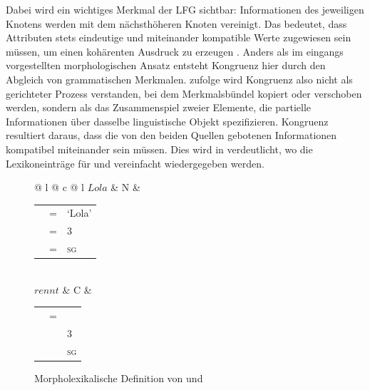Dabei wird ein wichtiges Merkmal der LFG sichtbar: Informationen des jeweiligen
Knotens werden mit dem nächsthöheren Knoten vereinigt. Das bedeutet, dass
Attributen stets eindeutige und miteinander kompatible Werte
zugewiesen sein müssen, um einen kohärenten Ausdruck zu erzeugen
\autocite[vgl.][43--54]{bresnanetal2016}. Anders als im eingangs vorgestellten
morphologischen Ansatz entsteht Kongruenz hier durch den Abgleich von
grammatischen Merkmalen.
\citet[7]{wechslerzlatic2003} zufolge wird Kongruenz also nicht als gerichteter
Prozess verstanden, bei dem Merkmalsbündel kopiert oder verschoben werden,
sondern als das Zusammenspiel zweier Elemente, die partielle Informationen über
dasselbe linguistische Objekt spezifizieren. Kongruenz resultiert daraus, dass
die von den beiden Quellen gebotenen Informationen kompatibel miteinander sein
müssen.
Dies wird in  verdeutlicht, wo die
Lexikoneinträge für
 und  vereinfacht wiedergegeben werden.

\begin{figure}
\begin{tabular}[t]{@{} l @{\hspace{2em}} c @{\hspace{2em}} l}
	$Lola$
	&	N
	&	\begin{tabular}[t]{l l l}
			\ups{pred}	& =	& `Lola' \\
			\ups{pers}	& =	& 3 \\
			\ups{num}	& =	& \textsc{sg} \\
		\end{tabular}
	\medskip \\

	$rennt$
	&	C
	&	\begin{tabular}[t]{l l l}
			\ups{pred}		& = 	& \astruct{rennen}{\ups{subj}} \\
			\ups{subj pers}	& \req	& 3 \\
			\ups{subj num}	& \req	& \textsc{sg} \\
		\end{tabular}
\end{tabular}
\caption{Morpholexikalische Definition von  und }
\label{fig:lolamorphlex}
\end{figure}


